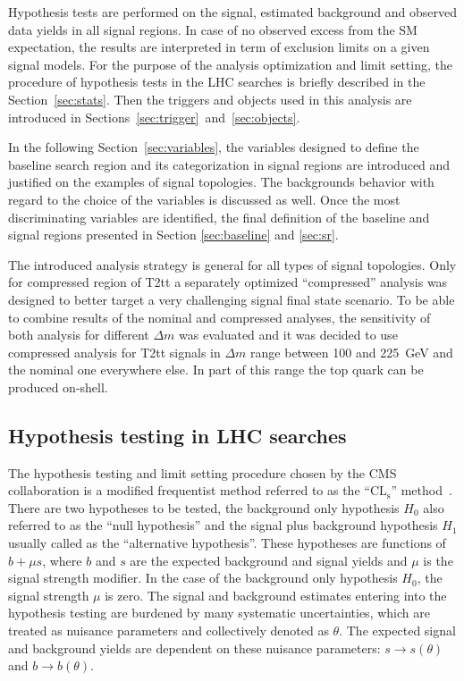 Hypothesis tests are performed on the signal, estimated background and observed data yields in all signal regions. In case of no observed excess from the SM expectation, the results are interpreted in term of exclusion limits on a given signal models. For the purpose of the analysis optimization and limit setting, the procedure of hypothesis tests in the LHC searches is briefly described in the Section~\ref{sec:stats}. Then the triggers and objects used in this analysis are introduced in Sections~\ref{sec:trigger}~and~\ref{sec:objects}.
 
In the following Section~\ref{sec:variables}, the variables designed to define the baseline search region and its categorization in signal regions are introduced and justified on the examples of signal topologies. The backgrounds behavior with regard to the choice of the variables is discussed as well. Once the most discriminating variables are identified, the final definition of the baseline and signal regions presented in Section \ref{sec:baseline} and \ref{sec:sr}. 

The introduced analysis strategy is general for all types of signal topologies. Only for compressed region of T2tt a separately optimized ``compressed'' analysis was designed to better target a very challenging signal final state scenario. To be able to combine results of the nominal and compressed analyses, the sensitivity of both analysis for different $\Delta m$ was evaluated and it was decided to use compressed analysis for T2tt signals in $\Delta m$ range between 100 and 225~GeV and the nominal one everywhere else. In part of this range the top quark can be produced on-shell.



\subsection{Hypothesis testing in LHC searches~\label{sec:stats} }

The hypothesis testing and limit setting procedure chosen by the CMS collaboration is a modified frequentist method referred to as the ``$\mathrm{CL_{s}}$'' method~\cite{Read:2002hq, CMS-NOTE-2011-005}. There are two hypotheses to be tested, the background only hypothesis $H_{0}$ also referred to as the ``null hypothesis'' and the signal plus background hypothesis $H_{1}$ usually called as the ``alternative hypothesis''. These hypotheses are functions of $b+\mu s$, where $b$ and $s$ are the expected background and signal yields and $\mu$ is the signal strength modifier. In the case of the background only hypothesis $H_{0}$, the signal strength $\mu$ is zero. The signal and background estimates entering into the hypothesis testing are burdened by many systematic uncertainties, which are  treated as nuisance parameters and collectively denoted as $\theta$. The expected signal and background yields are dependent on these nuisance parameters: $s \to s(\theta)$ and $b \to b(\theta)$.

